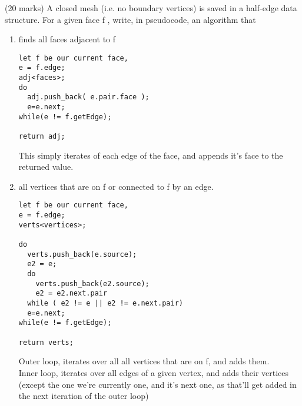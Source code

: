 (20 marks) A closed mesh (i.e. no boundary vertices) is saved in a half-edge data structure. For a given face f , write, in pseudocode, an algorithm that

\begin{enumerate}
\item finds all faces adjacent to f \\
\begin{verbatim}
let f be our current face,
e = f.edge;
adj<faces>;
do
  adj.push_back( e.pair.face );
  e=e.next;
while(e != f.getEdge);

return adj;
\end{verbatim}
This simply iterates of each edge of the face, and appends it's face to the returned value.\\
\item all vertices that are on f or connected to f by an edge. \\
\begin{verbatim}
let f be our current face,
e = f.edge;
verts<vertices>;

do
  verts.push_back(e.source);
  e2 = e;
  do
    verts.push_back(e2.source);
    e2 = e2.next.pair
  while ( e2 != e || e2 != e.next.pair)
  e=e.next;
while(e != f.getEdge);

return verts;
\end{verbatim}
Outer loop, iterates over all all vertices that are on f, and adds them. \\
Inner loop, iterates over all edges of a given vertex, and adds their vertices (except the one we're currently one, and it's next one, as that'll get added in the next iteration of the outer loop)
\end{enumerate}
